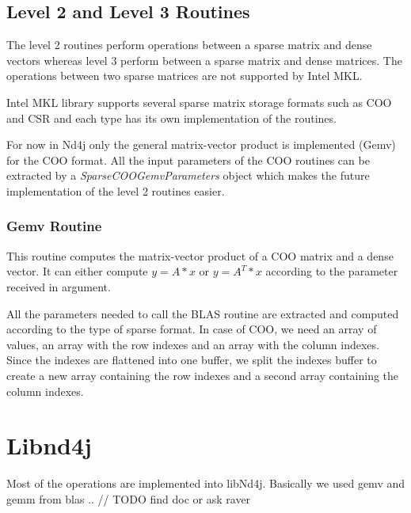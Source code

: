 \subsection{Level 2 and Level 3 Routines}

The level 2 routines perform operations between a sparse matrix and dense vectors whereas level 3 perform between a sparse matrix and dense matrices. The operations between two sparse matrices are not supported by Intel MKL.

Intel MKL library supports several sparse matrix storage formats such as COO and CSR and each type has its own implementation of the routines.

For now in Nd4j only the general matrix-vector product is implemented (Gemv) for the COO format. All the input parameters of the COO routines can be extracted by a \textit{SparseCOOGemvParameters} object which makes the future implementation of the level 2 routines easier.

\subsubsection{Gemv Routine}
This routine computes the matrix-vector product of a COO matrix and a dense vector. It can either compute $y = A*x$ or $y = A^{T}*x$ according to the parameter received in argument.

All the parameters needed to call the BLAS routine are extracted and computed according to the type of sparse format.
In case of COO, we need an array of values, an array with the row indexes and an array with the column indexes. Since the indexes are flattened into one buffer, we split the indexes buffer to create a new array containing the row indexes and a second array containing the column indexes.

\section{Libnd4j}
Most of the operations are implemented into libNd4j. Basically we used gemv and gemm from blas
..
// TODO find doc or ask raver